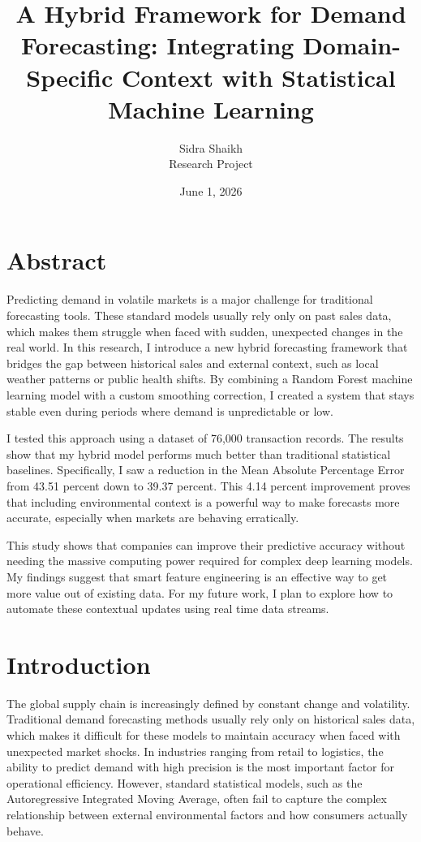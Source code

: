 \documentclass[12pt]{article}
\title{A Hybrid Framework for Demand Forecasting: Integrating Domain-Specific Context with Statistical Machine Learning}
\author{Sidra Shaikh \\ Research Project}
\date{June 1, 2026}
\begin{document}
\maketitle

\section*{Abstract}
Predicting demand in volatile markets is a major challenge for traditional forecasting tools. These standard models usually rely only on past sales data, which makes them struggle when faced with sudden, unexpected changes in the real world. In this research, I introduce a new hybrid forecasting framework that bridges the gap between historical sales and external context, such as local weather patterns or public health shifts. By combining a Random Forest machine learning model with a custom smoothing correction, I created a system that stays stable even during periods where demand is unpredictable or low.

I tested this approach using a dataset of 76,000 transaction records. The results show that my hybrid model performs much better than traditional statistical baselines. Specifically, I saw a reduction in the Mean Absolute Percentage Error from 43.51 percent down to 39.37 percent. This 4.14 percent improvement proves that including environmental context is a powerful way to make forecasts more accurate, especially when markets are behaving erratically.

This study shows that companies can improve their predictive accuracy without needing the massive computing power required for complex deep learning models. My findings suggest that smart feature engineering is an effective way to get more value out of existing data. For my future work, I plan to explore how to automate these contextual updates using real time data streams.
\section{Introduction}
The global supply chain is increasingly defined by constant change and volatility. Traditional demand forecasting methods usually rely only on historical sales data, which makes it difficult for these models to maintain accuracy when faced with unexpected market shocks. In industries ranging from retail to logistics, the ability to predict demand with high precision is the most important factor for operational efficiency. However, standard statistical models, such as the Autoregressive Integrated Moving Average, often fail to capture the complex relationship between external environmental factors and how consumers actually behave.
\end{document}
